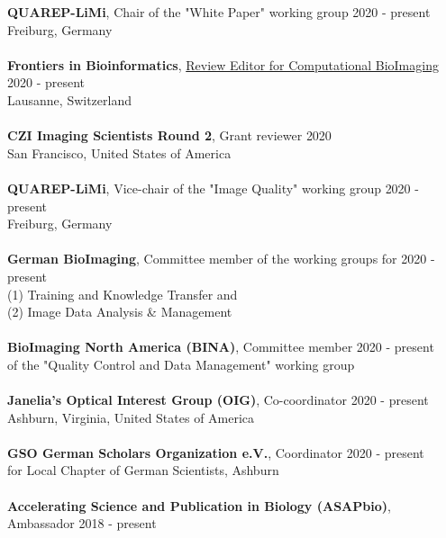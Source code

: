 \documentclass[margin,line]{res}
\begin{document}
\begin{resume}
{\bf QUAREP-LiMi}, Chair of the "White Paper" working group \hfill {2020 - present}\\
Freiburg, Germany\\
\vspace*{-3mm}\\
{\bf Frontiers in Bioinformatics},  \href{https://www.frontiersin.org/journals/bioinformatics/sections/computational-bioimaging}{Review Editor for Computational BioImaging} \hfill {2020 - present}\\
Lausanne, Switzerland\\
\vspace*{-3mm}\\
{\bf CZI Imaging Scientists Round 2}, Grant reviewer \hfill {2020}\\
San Francisco, United States of America\\
\vspace*{-3mm}\\
{\bf QUAREP-LiMi}, Vice-chair of the "Image Quality" working group  \hfill {2020 - present}\\
Freiburg, Germany\\
\vspace*{-3mm}\\
{\bf German BioImaging}, Committee member of the working groups for \hfill {2020 - present}\\
 (1)  Training and Knowledge Transfer and\\
(2) Image Data Analysis \& Management\\
\vspace*{-3mm}\\
{\bf BioImaging North America (BINA)}, Committee member \hfill {2020 - present}\\
of the "Quality Control and Data Management" working group\\
\vspace*{-3mm}\\
{\bf Janelia's Optical Interest Group (OIG)}, Co-coordinator \hfill {2020 - present}\\
Ashburn, Virginia, United States of America\\
\vspace*{-3mm}\\
{\bf GSO German Scholars Organization e.V.}, Coordinator  \hfill {2020 - present}\\
for Local Chapter of German Scientists, Ashburn\\
\vspace*{-3mm}\\
{\bf Accelerating Science and Publication in Biology (ASAPbio)}, Ambassador \hfill {2018 - present}\\

\end{resume}
\end{document}
